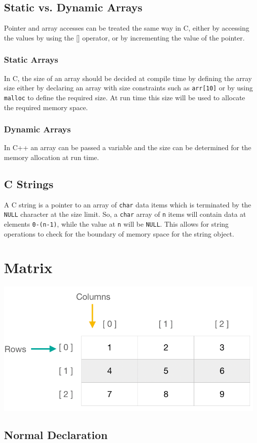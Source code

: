 \documentclass[11pt]{article}
\begin{document}
\subsection{Static vs. Dynamic Arrays}
Pointer and array accesses can be treated the same way in C, either by accessing the values by using the [] operator, or by incrementing the value of the pointer. 
\subsubsection{Static Arrays}
In C, the size of an array should be decided at compile time by defining the array size either by declaring an array with size constraints such as \texttt{arr[10]} or by using \texttt{malloc} to define the required size. At run time this size will be used to allocate the required memory space.
\subsubsection{Dynamic Arrays}
In C++ an array can be passed a variable and the size can be determined for the memory allocation at run time.
\subsection{C Strings}
A C string is a pointer to an array of \texttt{char} data items which is terminated by the \texttt{NULL} character at the size limit. So, a \texttt{char} array of \texttt{n} items will contain data at elements \texttt{0-(n-1)}, while the value at \texttt{n} will be \texttt{NULL}. This allows for string operations to check for the boundary of memory space for the string object.
\section{Matrix}
\begin{center}
    \includegraphics[width=250 px]{img/matrix}  \\
\end{center}
\subsection{Normal Declaration}
\end{document}
